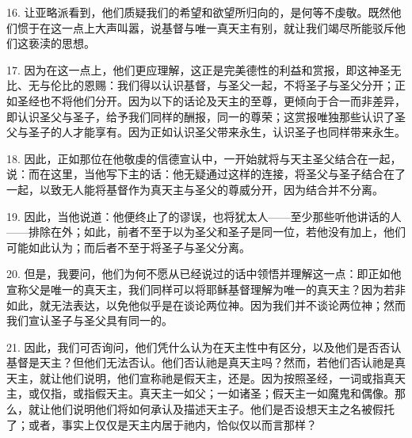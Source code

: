 16.  让亚略派看到，他们质疑我们的希望和欲望所归向的，是何等不虔敬。既然他们惯于在这一点上大声叫嚣，说基督与唯一真天主有别，就让我们竭尽所能驳斥他们这亵渎的思想。\par

17. 因为在这一点上，他们更应理解，这正是完美德性的利益和赏报，即这神圣无比、无与伦比的恩赐：我们得以认识基督，与圣父一起，不将圣子与圣父分开；正如圣经也不将他们分开。因为以下的话论及天主的至尊，更倾向于合一而非差异，即认识圣父与圣子，给予我们同样的酬报，同一的尊荣；这赏报唯独那些认识了圣父与圣子的人才能享有。因为正如认识圣父带来永生，认识圣子也同样带来永生。\par

18. 因此，正如那位在他敬虔的信德宣认中，一开始就将与天主圣父结合在一起，说：而在这里，当他写下主的话：他无疑通过这样的连接，将圣父与圣子结合在了一起，以致无人能将基督作为真天主与圣父的尊威分开，因为结合并不分离。\par

19. 因此，当他说道：他便终止了的谬误，也将犹太人——至少那些听他讲话的人——排除在外；如此，前者不至于以为圣父和圣子是同一位，若他没有加上，他们可能如此认为；而后者不至于将圣子与圣父分离。\par

20. 但是，我要问，他们为何不愿从已经说过的话中领悟并理解这一点：即正如他宣称父是唯一的真天主，我们同样可以将耶稣基督理解为唯一的真天主？因为若非如此，就无法表达，以免他似乎是在谈论两位神。因为我们并不谈论两位神；然而我们宣认圣子与圣父具有同一的。\par

21. 因此，我们可否询问，他们凭什么认为在天主性中有区分，以及他们是否否认基督是天主？但他们无法否认。他们否认祂是真天主吗？然而，若他们否认祂是真天主，就让他们说明，他们宣称祂是假天主，还是。因为按照圣经，一词或指真天主，或仅指，或指假天主。真天主一如父；一如诸圣；假天主一如魔鬼和偶像。那么，就让他们说明他们将如何承认及描述天主子。他们是否设想天主之名被假托了；或者，事实上仅仅是天主内居于祂内，恰似仅以而言那样？\par

